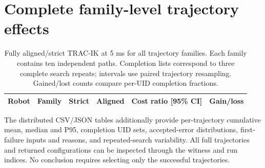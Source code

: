 \documentclass[10pt,a4paper]{article}
\begin{document}
\section{Complete family-level trajectory effects}
\label{app:family}

\begin{table}[htbp]
\centering\small\setlength{\tabcolsep}{4pt}
\caption{Fully aligned/strict TRAC-IK at 5 ms for all trajectory families.
Each family contains ten independent paths. Completion lists correspond to
three complete search repeats; intervals use paired trajectory resampling.
Gained/lost counts compare per-UID completion fractions.}
\label{tab:family}
\begin{tabular}{llrrrl}\toprule
Robot & Family & Strict & Aligned & Cost ratio [95\% CI] & Gain/loss\\\midrule

\end{tabular}
\end{table}

The distributed CSV/JSON tables additionally provide per-trajectory cumulative
mean, median and P95, completion UID sets, accepted-error distributions,
first-failure inputs and reasons, and repeated-search variability.
All full trajectories and returned configurations can be inspected through
the witness and run indices. No conclusion requires selecting only the
successful trajectories.

\FloatBarrier


\end{document}
